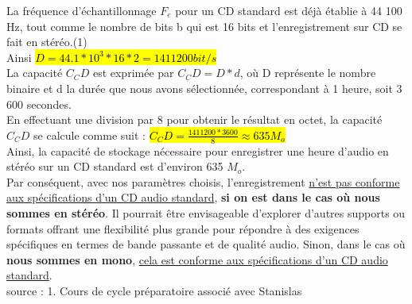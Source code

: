 La fréquence d'échantillonnage $F_e$ pour un CD standard est déjà établie à 44 100 Hz, tout comme le nombre de bits b qui est 16 bits et l'enregistrement sur CD se fait en stéréo.(1)
\\
Ainsi \hl{$D = 44.1*10^3*16*2 = 1 411 200 
 bit/s$}
\\
La capacité $C_CD$ est exprimée par $C_CD = D * d$, où D représente le nombre binaire et d la durée que nous avons sélectionnée, correspondant à 1 heure, soit 3 600 secondes.
\\
En effectuant une division par 8 pour obtenir le résultat en octet, la capacité $C_CD$ se calcule comme suit : \hl{$C_CD = \frac{1 411 200*3600}{8} \approx 635 M_o$}
\\
Ainsi, la capacité de stockage nécessaire pour enregistrer une heure d'audio en stéréo sur un CD standard est d'environ 635 $M_o$.
\\

Par conséquent, avec nos paramètres choisis, l'enregistrement \uline{n'est pas conforme aux spécifications d'un CD audio standard}, \textbf{si on est dans le cas où nous sommes en stéréo}. Il pourrait être envisageable d'explorer d'autres supports ou formats offrant une flexibilité plus grande pour répondre à des exigences spécifiques en termes de bande passante et de qualité audio. Sinon, dans le cas où \textbf{nous sommes en mono}, \uline{cela est conforme aux spécifications d'un CD audio standard}.
\\
\tiny{source :}
1. Cours de cycle préparatoire associé avec Stanislas
\normalsize
